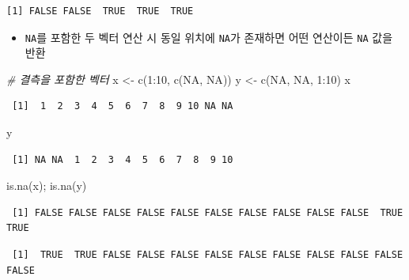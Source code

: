 \documentclass[
  11pt,
]{krantz}
\newenvironment{Shaded}{\begin{snugshade}}{\end{snugshade}}
\newcommand{\CommentTok}[1]{\textcolor[rgb]{0.37,0.37,0.37}{\textit{#1}}}
\newcommand{\ConstantTok}[1]{\textcolor[rgb]{0,0,0}{#1}}
\newcommand{\DecValTok}[1]{\textcolor[rgb]{0.06,0.06,0.06}{#1}}
\newcommand{\FunctionTok}[1]{\textcolor[rgb]{0,0,0}{#1}}
\newcommand{\NormalTok}[1]{#1}
\newcommand{\OtherTok}[1]{\textcolor[rgb]{0.37,0.37,0.37}{#1}}
\newcommand{\SpecialCharTok}[1]{\textcolor[rgb]{0,0,0}{#1}}
\providecommand{\tightlist}{%
  \setlength{\itemsep}{0pt}\setlength{\parskip}{0pt}}
\begin{document}
\begin{verbatim}
[1] FALSE FALSE  TRUE  TRUE  TRUE
\end{verbatim}

\normalsize

\begin{itemize}
\tightlist
\item
  \texttt{NA}를 포함한 두 벡터 연산 시 동일 위치에 \texttt{NA}가 존재하면 어떤 연산이든 \texttt{NA} 값을 반환
\end{itemize}

\footnotesize

\begin{Shaded}
\begin{Highlighting}[]
\CommentTok{\# 결측을 포함한 벡터}
\NormalTok{x }\OtherTok{\textless{}{-}} \FunctionTok{c}\NormalTok{(}\DecValTok{1}\SpecialCharTok{:}\DecValTok{10}\NormalTok{, }\FunctionTok{c}\NormalTok{(}\ConstantTok{NA}\NormalTok{, }\ConstantTok{NA}\NormalTok{))}
\NormalTok{y }\OtherTok{\textless{}{-}} \FunctionTok{c}\NormalTok{(}\ConstantTok{NA}\NormalTok{, }\ConstantTok{NA}\NormalTok{, }\DecValTok{1}\SpecialCharTok{:}\DecValTok{10}\NormalTok{)}
\NormalTok{x}
\end{Highlighting}
\end{Shaded}

\begin{verbatim}
 [1]  1  2  3  4  5  6  7  8  9 10 NA NA
\end{verbatim}

\begin{Shaded}
\begin{Highlighting}[]
\NormalTok{y}
\end{Highlighting}
\end{Shaded}

\begin{verbatim}
 [1] NA NA  1  2  3  4  5  6  7  8  9 10
\end{verbatim}

\begin{Shaded}
\begin{Highlighting}[]
\FunctionTok{is.na}\NormalTok{(x); }\FunctionTok{is.na}\NormalTok{(y)}
\end{Highlighting}
\end{Shaded}

\begin{verbatim}
 [1] FALSE FALSE FALSE FALSE FALSE FALSE FALSE FALSE FALSE FALSE  TRUE  TRUE
\end{verbatim}

\begin{verbatim}
 [1]  TRUE  TRUE FALSE FALSE FALSE FALSE FALSE FALSE FALSE FALSE FALSE FALSE
\end{verbatim}
\end{document}
